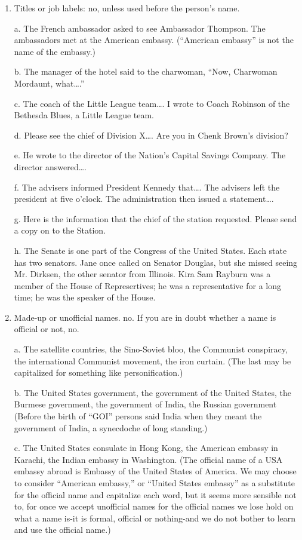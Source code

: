 \documentclass[
    oneside,
    11pt,
    draft
]{memoir}
\begin{document}
\begin{enumerate}
  \item Titles or job labels: no, unless used before the person's name.

    a. The French ambassador asked to see Ambassador Thompson. The ambassadors met at the American embassy. (\enquote{American embassy} is not the name of the embassy.) 

    b. The manager of the hotel said to the charwoman, \enquote{Now, Charwoman Mordaunt, what\dots.} 

    c. The coach of the Little League team\dots. I wrote to Coach Robinson of the Bethesda Blues, a Little League team.

    d. Please see the chief of Division X\dots. Are you in Chenk Brown's division? 

    e. He wrote to the director of the Nation's Capital Savings Company. The director answered\dots. 

    f. The advisers informed President Kennedy that\dots. The advisers left the president at five o'clock. The administration then issued a statement\dots. 

    g. Here is the information that the chief of the station requested. Please send a copy on to the  Station.

    h. The Senate is one part of the Congress of the United States. Each state has two senators. Jane once called on Senator Douglas, but she missed seeing Mr. Dirksen, the other senator from Illinois. Kira Sam Rayburn was a member of the House of Represertives; he was a representative for a long time; he was the speaker of the House.

  \item Made-up or unofficial names. no. If you are in doubt whether a name is official or not, no. 

    a. The satellite countries, the Sino-Soviet bloo, the Communist conspiracy, the international Communist movement, the iron curtain. (The last may be capitalized for something like personification.) 

    b. The United States government, the government of the United States, the Burmese government, the government of India, the Russian government (Before the birth of \enquote{GOI} persons said India when they meant the government of India, a synecdoche of long standing.) 

    c. The United States consulate in Hong Kong, the American embassy in Karachi, the Indian embassy in Washington. (The official name of a USA embassy abroad is Embassy of the United States of America. We may choose to consider \enquote{American embassy,} or \enquote{United States embassy} as a substitute for the official name and capitalize each word, but it seems more sensible not to, for once we accept unofficial names for the official names we lose hold on what a name is-it is formal, official or nothing-and we do not bother to learn and use the official name.)
    \end{enumerate}
\end{document}
